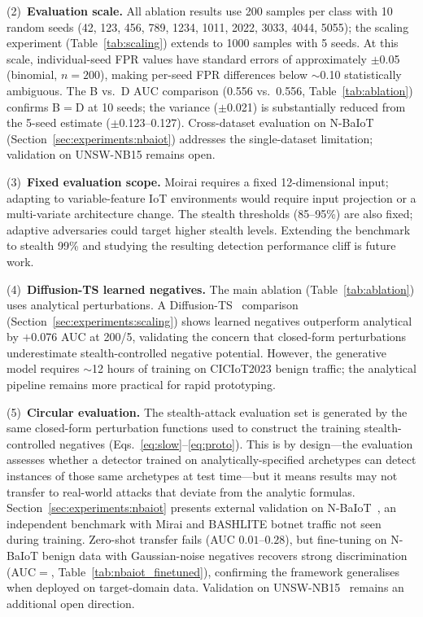 (2)~\textbf{Evaluation scale.}
All ablation results use 200 samples per class with 10 random seeds
(42, 123, 456, 789, 1234, 1011, 2022, 3033, 4044, 5055); the scaling experiment (Table~\ref{tab:scaling}) extends to
1000 samples with 5 seeds.
At this scale, individual-seed FPR values have standard errors
of approximately $\pm$0.05 (binomial, $n=200$), making per-seed FPR differences
below $\sim$0.10 statistically ambiguous.
The B vs.\ D AUC comparison (0.556 vs.\ 0.556, Table~\ref{tab:ablation})
confirms B$=$D at 10 seeds; the variance ($\pm$0.021) is substantially reduced
from the 5-seed estimate ($\pm$0.123--0.127).
Cross-dataset evaluation on N-BaIoT (Section~\ref{sec:experiments:nbaiot})
addresses the single-dataset limitation; validation on UNSW-NB15 remains open.

(3)~\textbf{Fixed evaluation scope.}
Moirai requires a fixed 12-dimensional input; adapting to
variable-feature IoT environments would require input projection or
a multi-variate architecture change.
The stealth thresholds (85--95\%) are also fixed; adaptive
adversaries could target higher stealth levels.  Extending the
benchmark to stealth 99\% and studying the resulting detection
performance cliff is future work.

(4)~\textbf{Diffusion-TS learned negatives.}
The main ablation (Table~\ref{tab:ablation}) uses analytical perturbations.
A Diffusion-TS~\cite{zhang2024diffusionts} comparison
(Section~\ref{sec:experiments:scaling}) shows learned negatives outperform
analytical by $+$0.076 AUC at 200/5, validating the concern that
closed-form perturbations underestimate stealth-controlled negative potential.
However, the generative model requires $\sim$12 hours of training on
CICIoT2023 benign traffic; the analytical pipeline remains more practical
for rapid prototyping.

(5)~\textbf{Circular evaluation.}
The stealth-attack evaluation set is generated by the same closed-form
perturbation functions used to construct the training stealth-controlled negatives
(Eqs.~\ref{eq:slow}--\ref{eq:proto}).  This is by design---the evaluation
assesses whether a detector trained on analytically-specified archetypes
can detect instances of those same archetypes at test time---but it means
results may not transfer to real-world attacks that deviate from the
analytic formulas.
Section~\ref{sec:experiments:nbaiot} presents external validation
on N-BaIoT~\cite{meidan2018n}, an independent benchmark with Mirai and BASHLITE
botnet traffic not seen during training.
Zero-shot transfer fails (AUC $0.01$--$0.28$), but fine-tuning on N-BaIoT
benign data with Gaussian-noise negatives recovers strong discrimination
(AUC$=$\nbaiotAUC{}, Table~\ref{tab:nbaiot_finetuned}), confirming the
framework generalises when deployed on target-domain data.
Validation on UNSW-NB15~\cite{moustafa2015unsw} remains an additional open direction.


